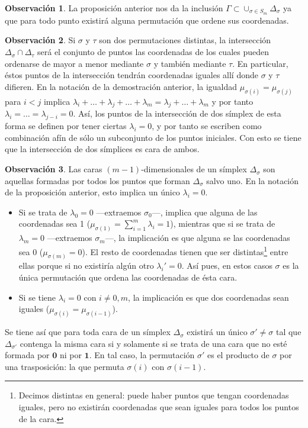 \documentclass[12pt,a4paper,twoside]{article} %
\theoremstyle{plain}
\theoremstyle{definition}
\newtheorem{observacion}{Observación}[subsection]
\begin{document}
\begin{observacion}
La proposición anterior nos da la inclusión $\Gamma \subset \cup_{\sigma\in S_m} \Delta_\sigma $ ya que para todo punto existirá alguna permutación que ordene sus coordenadas.
\end{observacion}

\begin{observacion}
\label{obs_intersecciones}
Si $\sigma$ y $\tau$ son dos permutaciones distintas, la intersección $\Delta_\sigma \cap \Delta_\tau$ será el conjunto de puntos las coordenadas de los cuales pueden ordenarse de mayor a menor mediante $\sigma$ y también mediante $\tau$. En particular, éstos puntos de la intersección tendrán coordenadas iguales allí donde $\sigma$ y $\tau$ difieren. En la notación de la demostración anterior, la igualdad $\mu_{\sigma(i)} = \mu_{\sigma(j)}$ para $i < j$ implica $\lambda_i + \dots + \lambda_j + \dots + \lambda_m = \lambda_j + \dots + \lambda_m $ y por tanto $\lambda_i=\dots=\lambda_{j-i}=0$. Así, los puntos de la intersección de dos símplex de esta forma se definen por tener ciertas $\lambda_i=0$, y por tanto se escriben como combinación afín de sólo un subconjunto de los puntos iniciales. Con esto se tiene que la intersección de dos símplices es cara de ambos.
\end{observacion}

\begin{observacion}
Las caras $(m-1)$-dimensionales de un símplex $\Delta_\sigma$ son aquellas formadas por todos los puntos que forman $\Delta_\sigma$ salvo uno. En la notación de la proposición anterior, esto implica un único $\lambda_i=0$.
\begin{itemize}
\item Si se trata de $\lambda_0=0$ ---extraemos $\sigma_0$---, implica que alguna de las coordenadas sea 1 ($\mu_{\sigma(1)} = \sum_{i=1}^m \lambda_i =1$), mientras que si se trata de $\lambda_m=0$ ---extraemos $\sigma_m$---, la implicación es que alguna se las coordenadas sea 0 ($\mu_{\sigma(m)}=0$). El resto de coordenadas tienen que ser distintas\footnote{Decimos distintas en general: puede haber puntos que tengan coordenadas iguales, pero no existirán coordenadas que sean iguales para todos los puntos de la cara.} entre ellas porque si no existiría algún otro $\lambda_i'=0$. Así pues, en estos casos $\sigma$ es la única permutación que ordena las coordenadas de ésta cara.
\item Si se tiene $\lambda_i=0$ con $i \neq 0,m$, la implicación es que dos coordenadas sean iguales ($\mu_{\sigma(i)} = \mu_{\sigma(i-1)}$).
\end{itemize}
Se tiene así que para toda cara de un símplex $\Delta_\sigma$ existirá un único $\sigma'\neq\sigma$ tal que $\Delta_{\sigma'}$ contenga la misma cara si y solamente si se trata de una cara que no esté formada por $\bm{0}$ ni por $\bm{1}$. En tal caso, la permutación $\sigma'$ es el producto de $\sigma$ por una trasposición: la que permuta $\sigma(i)$ con $\sigma(i-1)$.   
\label{obs_carassimplice}
\end{observacion}
\end{document}
